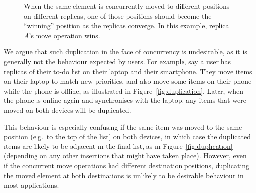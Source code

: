 \documentclass[sigplan,10pt]{acmart}
\begin{document}
\begin{figure}
    \caption{When the same element is concurrently moved to different positions on different replicas, one of those positions should become the ``winning'' position as the replicas converge. In this example, replica $A$'s move operation wins.}
    \label{fig:concurrent}
\end{figure}

We argue that such duplication in the face of concurrency is undesirable, as it is generally not the behaviour expected by users.
For example, say a user has replicas of their to-do list on their laptop and their smartphone.
They move items on their laptop to match new priorities, and also move some items on their phone while the phone is offline, as illustrated in Figure~\ref{fig:duplication}.
Later, when the phone is online again and synchronises with the laptop, any items that were moved on both devices will be duplicated.

This behaviour is especially confusing if the same item was moved to the same position (e.g.\ to the top of the list) on both devices, in which case the duplicated items are likely to be adjacent in the final list, as in Figure~\ref{fig:duplication} (depending on any other insertions that might have taken place).
However, even if the concurrent move operations had different destination positions, duplicating the moved element at both destinations is unlikely to be desirable behaviour in most applications.
\end{document}
